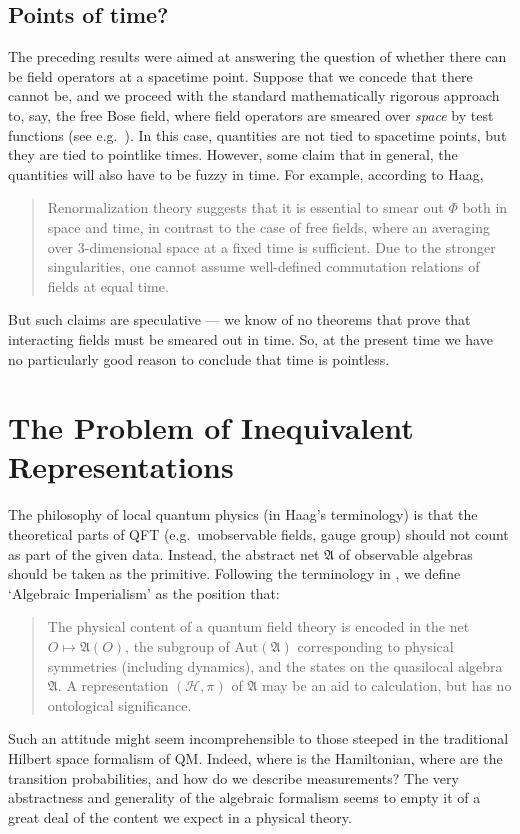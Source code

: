 \documentclass[11pt]{article}
\theoremstyle{definition}
\theoremstyle{definition}
\theoremstyle{remark}
\def\2#1{{\mathcal #1}}
\def\al#1{{\mathfrak #1}}
\newcommand{\Aut}{\mathrm{Aut}}
\begin{document}
\subsection{Points of time?}

The preceding results were aimed at answering the question of whether
there can be field operators at a spacetime point.  Suppose that we
concede that there cannot be, and we proceed with the standard
mathematically rigorous approach to, say, the free Bose field, where
field operators are smeared over \emph{space} by test functions (see
e.g.\ \cite{arak-bose}).  In this case, quantities are not tied to
spacetime points, but they are tied to pointlike times.  However, some
claim that in general, the quantities will also have to be fuzzy in
time.  For example, according to Haag,
\begin{quote}
  Renormalization theory suggests that it is essential to smear out
  $\Phi$ both in space and time, in contrast to the case of free
  fields, where an averaging over $3$-dimensional space at a fixed
  time is sufficient.  Due to the stronger singularities, one cannot
  assume well-defined commutation relations of fields at equal time.
  \cite[p.\ 59]{haag} \end{quote} But such claims are speculative ---
we know of no theorems that prove that interacting fields must be
smeared out in time.  So, at the present time we have no particularly
good reason to conclude that time is pointless.


\section{The Problem of Inequivalent Representations} \label{inter}

The philosophy of local quantum physics (in Haag's terminology) is
that the theoretical parts of QFT (e.g.\ unobservable fields, gauge
group) should not count as part of the given data.  Instead, the
abstract net $\al A$ of observable algebras should be taken as the
primitive.  Following the terminology in \cite{ruetsche}, we define
`Algebraic Imperialism' as the position that:
\begin{quote}
  The physical content of a quantum field theory is encoded in the net
  $O\mapsto \al A(O)$, the subgroup of $\Aut (\al A)$ corresponding to
  physical symmetries (including dynamics), and the states on the
  quasilocal algebra $\al A$.  A representation $(\2H ,\pi )$ of $\al
  A$ may be an aid to calculation, but has no ontological
  significance.
\end{quote}
Such an attitude might seem incomprehensible to those steeped in the
traditional Hilbert space formalism of QM. Indeed, where is the
Hamiltonian, where are the transition probabilities, and how do we
describe measurements?  The very abstractness and generality of the
algebraic formalism seems to empty it of a great deal of the content
we expect in a physical theory.
\end{document}
